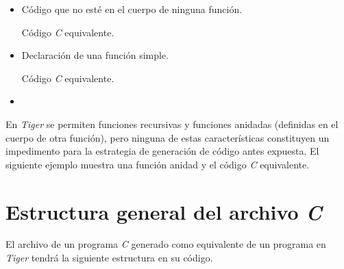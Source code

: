 \documentclass{article}
\begin{document}
\begin{itemize}

    \item Código que no esté en el cuerpo de ninguna función.
    
    \begin{quote}
    
    \end{quote}

    Código \textit{C} equivalente.

    \begin{quote}
    
    \end{quote}

    \item Declaración de una función simple.
    
    \begin{quote}
    
    \end{quote}

    Código \textit{C} equivalente.

    \begin{quote}
    
    \end{quote}\item 

\end{itemize}

En \textit{Tiger} se permiten funciones recursivas y funciones anidadas
(definidas en el cuerpo de otra función), pero ninguna de estas características
constituyen un impedimento para la estrategia de generación de código antes
expuesta. El siguiente ejemplo muestra una función anidad y el código
\textit{C} equivalente. 


\section{Estructura general del archivo \emph{C}}

El archivo de un programa \textit{C} generado como equivalente de un programa en
\textit{Tiger} tendrá la siguiente estructura en su código.
\end{document}

